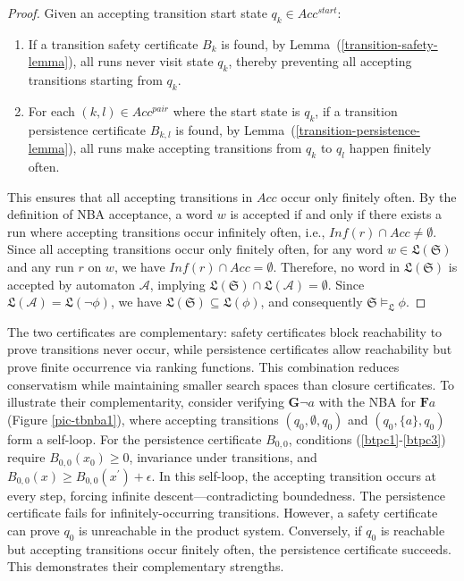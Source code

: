 \begin{proof}
  Given an accepting transition start state $q_k \in Acc^{start}$:
  \begin{enumerate}
      \item If a transition safety certificate $B_k$ is found, by Lemma~(\ref{transition-safety-lemma}), all runs never visit state $q_k$, thereby preventing all accepting transitions starting from $q_k$.

      \item For each $(k, l) \in Acc^{pair}$ where the start state is $q_k$, if a transition persistence certificate $B_{k,l}$ is found, by Lemma~(\ref{transition-persistence-lemma}), all runs make accepting transitions from $q_k$ to $q_l$ happen finitely often.
  \end{enumerate}

  This ensures that all accepting transitions in $Acc$ occur only finitely often. By the definition of NBA acceptance, a word $w$ is accepted if and only if there exists a run where accepting transitions occur infinitely often, i.e., $\mathit{Inf}(r) \cap Acc \neq \emptyset$. Since all accepting transitions occur only finitely often, for any word $w \in \mathfrak{L}(\mathfrak{S})$ and any run $r$ on $w$, we have $\mathit{Inf}(r) \cap Acc = \emptyset$. Therefore, no word in $\mathfrak{L}(\mathfrak{S})$ is accepted by automaton $\mathcal{A}$, implying $\mathfrak{L}(\mathfrak{S}) \cap \mathfrak{L}(\mathcal{A}) = \emptyset$. Since $\mathfrak{L}(\mathcal{A}) = \mathfrak{L}(\neg \phi)$, we have $\mathfrak{L}(\mathfrak{S}) \subseteq \mathfrak{L}(\phi)$, and consequently $\mathfrak{S} \models_{\mathfrak{L}} \phi$.
\end{proof}

The two certificates are complementary: safety certificates block reachability to prove transitions never occur, while persistence certificates allow reachability but prove finite occurrence via ranking functions. This combination reduces conservatism while maintaining smaller search spaces than closure certificates. To illustrate their complementarity, consider verifying $\mathbf{G} \neg a$ with the NBA for $\mathbf{F} a$ (Figure \ref{pic-tbnba1}), where accepting transitions $(q_0, \emptyset, q_0)$ and $(q_0, \{a\}, q_0)$ form a self-loop. For the persistence certificate $B_{0,0}$, conditions (\ref{btpc1}-\ref{btpc3}) require $B_{0,0}(x_0) \geq 0$, invariance under transitions, and $B_{0,0}(x) \geq B_{0,0}(x^{\prime}) + \epsilon$. In this self-loop, the accepting transition occurs at every step, forcing infinite descent—contradicting boundedness. The persistence certificate fails for infinitely-occurring transitions. However, a safety certificate can prove $q_0$ is unreachable in the product system. Conversely, if $q_0$ is reachable but accepting transitions occur finitely often, the persistence certificate succeeds. This demonstrates their complementary strengths.

